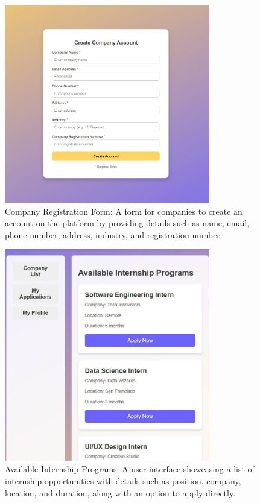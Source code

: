 \begin{figure}[H]
\centering
\includegraphics[width=0.8\textwidth]{Images/7.jpg}
\caption{\label{fig:metamodel7}Company Registration Form: A form for companies to create an account on the platform by providing details such as name, email, phone number, address, industry, and registration number.}
\end{figure}

\begin{figure}[H]
\centering
\includegraphics[width=0.8\textwidth]{Images/8.jpg}
\caption{\label{fig:metamodel8}Available Internship Programs: A user interface showcasing a list of internship opportunities with details such as position, company, location, and duration, along with an option to apply directly.}
\end{figure}


